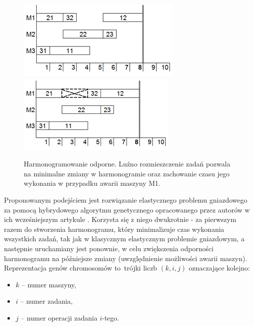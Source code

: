 \documentclass[archivemode]{mgr}
\begin{document}
\begin{figure}[!ht]
\begin{center}
\includegraphics[width=1.0\linewidth]{rysunki/odporny_jobshopA.png}
\endminipage \hfill
{}%
\includegraphics[width=1.0\linewidth]{rysunki/odporny_jobshopB.png}
\endminipage
\caption[Harmonogramowanie odporne]{Harmonogramowanie odporne. Luźno rozmieszczenie zadań pozwala na minimalne zmiany w harmonogramie oraz zachowanie czasu jego wykonania w przypadku awarii maszyny M1.}
\label{rys_odporny_jobshop}
\end{center}
\end{figure}
Proponowanym podejściem jest rozwiązanie elastycznego problemu gniazdowego za pomocą hybrydowego algorytmu genetycznego opracowanego przez autorów \cite{RFJSRMB_ElMekkawy11} w ich wcześniejszym artykule \cite{AEHGAFJS_ElMekkawy11}. Korzysta się z niego dwukrotnie - za pierwszym razem do stworzenia harmonogramu, który minimalizuje czas wykonania wszystkich zadań, tak jak w klasycznym elastycznym problemie gniazdowym, a następnie uruchamiany jest ponownie, w celu zwiększenia odporności harmonogramu na późniejsze zmiany (uwzględnienie możliwości awarii maszyn). Reprezentacja genów chromosomów to~trójki liczb $(k,i,j)$ oznaczające kolejno:
\begin{itemize}
    \item $k$ -- numer maszyny,
    \item $i$ -- numer zadania,
    \item $j$ -- numer operacji zadania $i$-tego.
\end{itemize}
\end{document}
